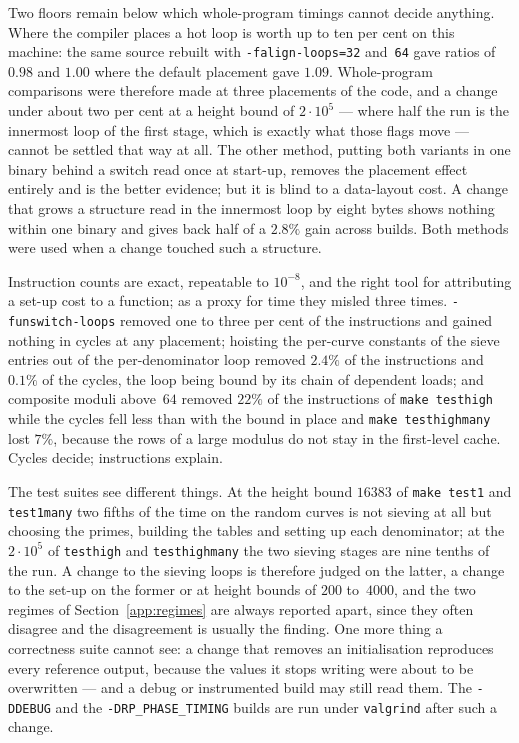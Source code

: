 \documentclass[12pt,a4paper,oneside]{amsart}
\begin{document}
Two floors remain below which whole-program timings cannot decide anything.
Where the compiler places a hot loop is worth up to ten per cent on this
machine: the same source rebuilt with \texttt{-falign-loops=32} and~\texttt{64}
gave ratios of $0.98$ and $1.00$ where the default placement gave $1.09$.
Whole-program comparisons were therefore made at three placements of the
code, and a change under about two per cent at a height bound of
$2\cdot10^5$ --- where half the run is the innermost loop of the first stage,
which is exactly what those flags move --- cannot be settled that way at
all. The other method, putting both variants in one binary behind a switch
read once at start-up, removes the placement effect entirely and is the
better evidence; but it is blind to a data-layout cost. A change that grows
a structure read in the innermost loop by eight bytes shows nothing within
one binary and gives back half of a $2.8\%$ gain across builds. Both methods
were used when a change touched such a structure.

Instruction counts are exact, repeatable to $10^{-8}$, and the right tool for
attributing a set-up cost to a function; as a proxy for time they misled
three times. \texttt{-funswitch-loops} removed one to three per cent of the
instructions and gained nothing in cycles at any placement; hoisting the
per-curve constants of the sieve entries out of the per-denominator loop
removed $2.4\%$ of the instructions and $0.1\%$ of the cycles, the loop being
bound by its chain of dependent loads; and composite moduli above~$64$
removed $22\%$ of the instructions of \texttt{make testhigh} while the cycles
fell less than with the bound in place and \texttt{make testhighmany} lost
$7\%$, because the rows of a large modulus do not stay in the first-level
cache. Cycles decide; instructions explain.

The test suites see different things. At the height bound $16383$ of
\texttt{make test1} and \texttt{test1many} two fifths of the time on the
random curves is not sieving at all but choosing the primes, building the
tables and setting up each denominator; at the $2\cdot10^5$ of
\texttt{testhigh} and \texttt{testhighmany} the two sieving stages are nine
tenths of the run. A change to the sieving loops is therefore judged on the
latter, a change to the set-up on the former or at height bounds of $200$
to~$4000$, and the two regimes of Section~\ref{app:regimes} are always
reported apart, since they often disagree and the disagreement is usually
the finding. One more thing a correctness suite cannot see: a change that
removes an initialisation reproduces every reference output, because the
values it stops writing were about to be overwritten --- and a debug or
instrumented build may still read them. The \texttt{-DDEBUG} and the
\texttt{-DRP\_PHASE\_TIMING} builds are run under \texttt{valgrind} after
such a change.
\end{document}
